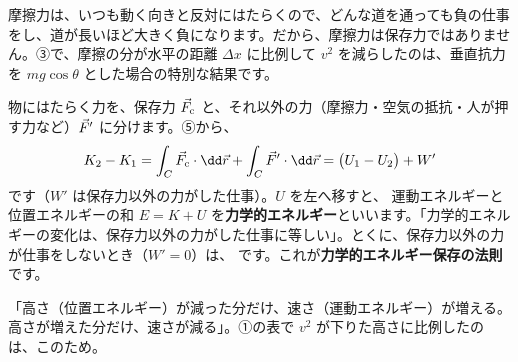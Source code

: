 \begin{seikaku}
摩擦力は、いつも動く向きと反対にはたらくので、どんな道を通っても負の仕事をし、道が長いほど大きく負になります。だから、摩擦力は保存力ではありません。③で、摩擦の分が水平の距離 $\Delta x$ に比例して $v^2$ を減らしたのは、垂直抗力を $mg\cos\theta$ とした場合の特別な結果です。
\end{seikaku}

\label{ph:力-4:sec7}
物にはたらく力を、保存力 $\vec{F}_{\mathrm c}$ と、それ以外の力（摩擦力・空気の抵抗・人が押す力など）$\vec{F}'$ に分けます。⑤から、
\[K_2-K_1=\int_C\pxev F_{\mathrm c}\cdot\dd\pxev r+\int_C\pxev F'\cdot\dd\pxev r=\bigl(U_1-U_2\bigr)+W'\]
です（$W'$ は保存力以外の力がした仕事）。$U$ を左へ移すと、
\label{ph:力-4:sonshitsu}運動エネルギーと位置エネルギーの和 $E=K+U$ を\textbf{力学的エネルギー}といいます。「力学的エネルギーの変化は、保存力以外の力がした仕事に等しい」。とくに、保存力以外の力が仕事をしないとき（$W'=0$）は、
\label{ph:力-4:hozon}です。これが\textbf{力学的エネルギー保存の法則}です。

\begin{phyomi}[$\dfrac{1}{2}mv^2+mgh=$ 一定]
「高さ（位置エネルギー）が減った分だけ、速さ（運動エネルギー）が増える。高さが増えた分だけ、速さが減る」。①の表で $v^2$ が下りた高さに比例したのは、このため。
\end{phyomi}

